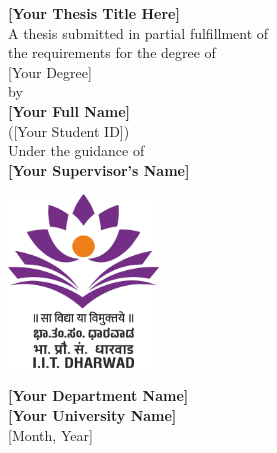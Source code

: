 \documentclass[12pt]{report}
\begin{document}
\thispagestyle{empty}
\begin{center}
    \vspace*{1cm}
    {\textbf{\LARGE [Your Thesis Title Here]}}\\
    
    \vspace*{1cm}
    {\large A thesis submitted in partial fulfillment of\\
    the requirements for the degree of}\\
    
    \vspace*{0.5cm}
    {\large [Your Degree]}\\
    
    \vspace*{0.5cm}
    {\large by}\\
    
    \vspace*{0.5cm}
    {\textbf{\Large [Your Full Name]}}\\
    \vspace*{0.25cm}
    {\large ([Your Student ID])}\\
    
    \vspace*{1cm}
    {\large Under the guidance of}\\
    \vspace*{0.25cm}
    {\textbf{\Large [Your Supervisor's Name]}}\\
    
    \vspace*{1.75cm}
    
    \includegraphics[width=0.3\textwidth]{logo.png}
    
    \vspace*{0.75cm}
    {\textbf{\large [Your Department Name]}}\\ \vspace*{0.2cm}
    {\textbf{\large [Your University Name]}}\\ \vspace*{0.2cm}
    {\large [Month, Year]}
    
\end{center}
\end{document}
